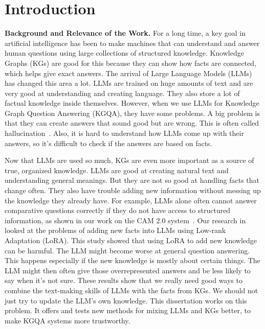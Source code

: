 \chapter*{Introduction}
\label{chap:introduction}

\textbf{Background and Relevance of the Work.}
For a long time, a key goal in artificial intelligence has been to make machines that can understand and answer human questions using large collections of structured knowledge. Knowledge Graphs (KGs) are good for this because they can show how facts are connected, which helps give exact answers. The arrival of Large Language Models (LLMs) has changed this area a lot. LLMs are trained on huge amounts of text and are very good at understanding and creating language. They also store a lot of factual knowledge inside themselves. However, when we use LLMs for Knowledge Graph Question Answering (KGQA), they have some problems. A big problem is that they can create answers that sound good but are wrong. This is often called hallucination~\cite{lin-etal-2022-truthfulqa, DBLP:conf/emnlp/RobertsRS20, DBLP:journals/csur/JiLFYSXIBMF23, DBLP:journals/corr/abs-2401-01313}. Also, it is hard to understand how LLMs come up with their answers, so it's difficult to check if the answers are based on facts.


Now that LLMs are used so much, KGs are even more important as a source of true, organized knowledge. LLMs are good at creating natural text and understanding general meanings. But they are not so good at handling facts that change often. They also have trouble adding new information without messing up the knowledge they already have. For example, LLMs alone often cannot answer comparative questions correctly if they do not have access to structured information, as shown in our work on the CAM 2.0 system~\cite{DBLP:conf/coling/ShalloufHSVMPBN24}. Our research in~\cite{pletenev-etal-2025-much} looked at the problems of adding new facts into LLMs using Low-rank Adaptation (LoRA). This study showed that using LoRA to add new knowledge can be harmful. The LLM might become worse at general question answering. This happens especially if the new knowledge is mostly about certain things. The LLM might then often give those overrepresented answers and be less likely to say when it's not sure. These results show that we really need good ways to combine the text-making skills of LLMs with the facts from KGs. We should not just try to update the LLM's own knowledge. This dissertation works on this problem. It offers and tests new methods for mixing LLMs and KGs better, to make KGQA systems more trustworthy.

